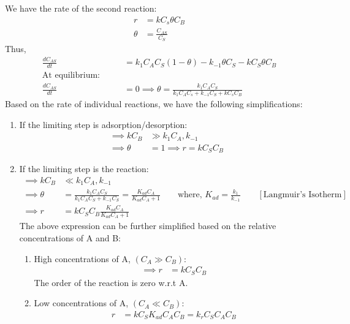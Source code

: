 We have the rate of the second reaction:
\begin{align*}
    r &= k C_s \theta C_B\\
    \theta &= \frac{C_{AS}}{C_S}
\end{align*}
Thus,
\begin{align*}
    \frac{d C_{AS}}{dt} &= k_1 C_A C_S (1-\theta) - k_{-1} \theta C_S - k C_S \theta C_B\\
    \text{At equilibrium}:\qquad &\\
    \frac{d C_{AS}}{dt} &= 0
    \implies \theta = \frac{k_1 C_A C_S}{k_1 C_A C_s + k_{-1}C_S + k C_s C_B}
\end{align*}
Based on the rate of individual reactions, we have the following
simplifications:
\begin{enumerate}
    \item If the limiting step is adsorption/desorption:
    \begin{align*}
        \implies k C_B &\gg k_1 C_A, k_{-1}\\
        \implies \theta &= 1 \implies r = k C_S C_B
    \end{align*}

    \item If the limiting step is the reaction:
    \begin{align*}
        \implies k C_B &\ll k_1 C_A, k_{-1}\\
        \implies \theta &= \frac{k_1 C_A C_S}{k_1 C_A C_S + k_{-1}C_S}
                        = \frac{K_{ad} C_A}{K_{ad}C_A + 1} \qquad
        \text{where, } K_{ad} = \frac{k_1}{k_{-1}} \qquad
        [\text{Langmuir's Isotherm}]\\
        \implies r &= k C_S C_B \frac{K_{ad} C_A}{K_{ad}C_A + 1}
    \end{align*}
The above expression can be further simplified based on the relative
concentrations of A and B:
\begin{enumerate}
    \item High concentrations of A, $(C_A \gg C_B)$:
    \begin{align*}
        \implies r &= k C_S C_B
    \end{align*}
    The order of the reaction is zero w.r.t A.
    \item Low concentrations of A, $(C_A \ll C_B)$:
    \begin{align*}
        r &= k C_S K_{ad} C_A C_B = k_r C_S C_A C_B
    \end{align*}
\end{enumerate}
\end{enumerate}

